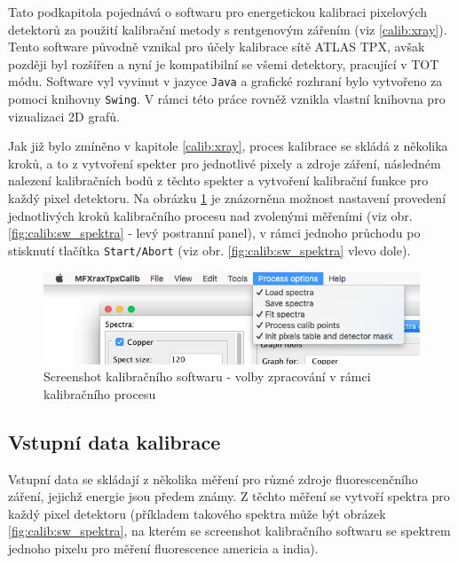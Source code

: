 
Tato podkapitola pojednává o softwaru pro energetickou kalibraci pixelových detektorů za použití kalibrační metody s rentgenovým zářením (viz \ref{calib:xray}). Tento software původně vznikal pro účely kalibrace sítě ATLAS TPX, avšak později byl rozšířen a nyní je kompatibilní se všemi detektory, pracující v TOT módu. Software vyl vyvinut v jazyce \texttt{Java} a grafické rozhraní bylo vytvořeno za pomoci knihovny \texttt{Swing}. V rámci této práce rovněž vznikla vlastní knihovna pro vizualizaci 2D grafů.

Jak již bylo zmíněno v kapitole \ref{calib:xray}, proces kalibrace se skládá z několika kroků, a to z vytvoření spekter pro jednotlivé pixely a zdroje záření, následném nalezení kalibračních bodů z těchto spekter a vytvoření kalibrační funkce pro každý pixel detektoru. Na obrázku \ref{fig:calib:sw_process_ops} je znázorněna možnost nastavení provedení jednotlivých kroků kalibračního procesu nad zvolenými měřeními (viz obr. \ref{fig:calib:sw_spektra} - levý postranní panel), v rámci jednoho průchodu po stisknutí tlačítka \texttt{Start/Abort} (viz obr. \ref{fig:calib:sw_spektra} vlevo dole).

\begin{figure}[th]
	\begin{center}
		\includegraphics[width=14cm]{figures/calibsw_process_ops.png}
		\caption{Screenshot kalibračního softwaru - volby zpracování v rámci kalibračního procesu}
		\label{fig:calib:sw_process_ops}
	\end{center}
\end{figure}


\subsection{Vstupní data kalibrace}
Vstupní data se skládají z několika měření pro různé zdroje fluorescenčního záření, jejichž energie jsou předem známy. Z těchto měření se vytvoří spektra pro každý pixel detektoru (příkladem takového spektra může být obrázek \ref{fig:calib:sw_spektra}, na kterém se screenshot kalibračního softwaru se spektrem jednoho pixelu pro měření fluorescence americia a india).

